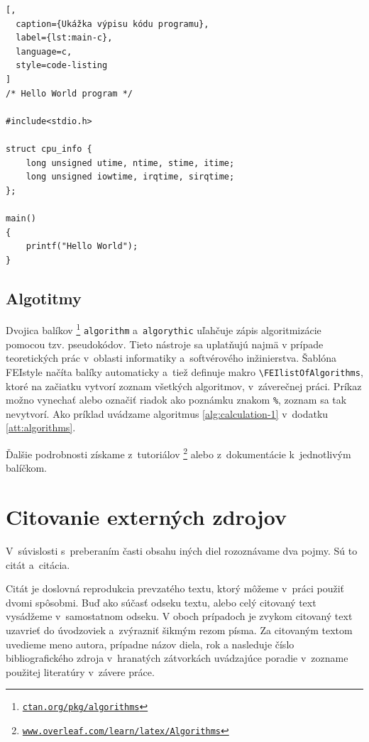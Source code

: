 \begin{lstlisting}[,
  caption={Ukážka výpisu kódu programu},
  label={lst:main-c},
  language=c,
  style=code-listing
]
/* Hello World program */

#include<stdio.h>

struct cpu_info {
    long unsigned utime, ntime, stime, itime;
    long unsigned iowtime, irqtime, sirqtime;
};

main()
{
    printf("Hello World");
}
\end{lstlisting}

\subsection*{Algotitmy}
Dvojica balíkov%
\footnote{\href{https://ctan.org/pkg/algorithms}{\texttt{ctan.org/pkg/algorithms}}}
\verb|algorithm|
a~\verb|algorythic| uľahčuje zápis algoritmizácie pomocou tzv. pseudokódov.
Tieto nástroje sa uplatňujú najmä v prípade teoretických prác v~oblasti informatiky a~softvérového inžinierstva. 
Šablóna FEIstyle načíta balíky automaticky a~tiež definuje makro \verb|\FEIlistOfAlgorithms|, ktoré na začiatku vytvorí zoznam všetkých algoritmov, v~záverečnej práci.
Príkaz možno vynechať alebo označiť riadok ako poznámku znakom \verb|%|, zoznam sa tak nevytvorí. Ako príklad uvádzame algoritmus \ref{alg:calculation-1} v~dodatku \ref{att:algorithms}.

Ďalšie podrobnosti získame z~tutoriálov%
\footnote{\href{https://www.overleaf.com/learn/latex/Algorithms}{\texttt{www.overleaf.com/learn/latex/Algorithms}}}
alebo z~dokumentácie k~jednotlivým balíčkom.

\section{Citovanie externých zdrojov}\label{sec:citation}
V~súvislosti s~preberaním časti obsahu iných diel
rozoznávame dva pojmy. Sú to citát a~citácia.

Citát je doslovná reprodukcia prevzatého textu,
ktorý môžeme v~práci použiť dvomi spôsobmi.
Buď ako súčasť odseku textu,
alebo celý citovaný text vysádžeme v~samostatnom odseku.
V oboch prípadoch je zvykom citovaný text uzavrieť do úvodzoviek 
a~zvýrazniť šikmým rezom písma.
Za citovaným textom uvedieme meno autora,
prípadne názov diela, rok a nasleduje číslo bibliografického 
zdroja v~hranatých zátvorkách uvádzajúce poradie
v~zozname použitej literatúry v~závere práce.

